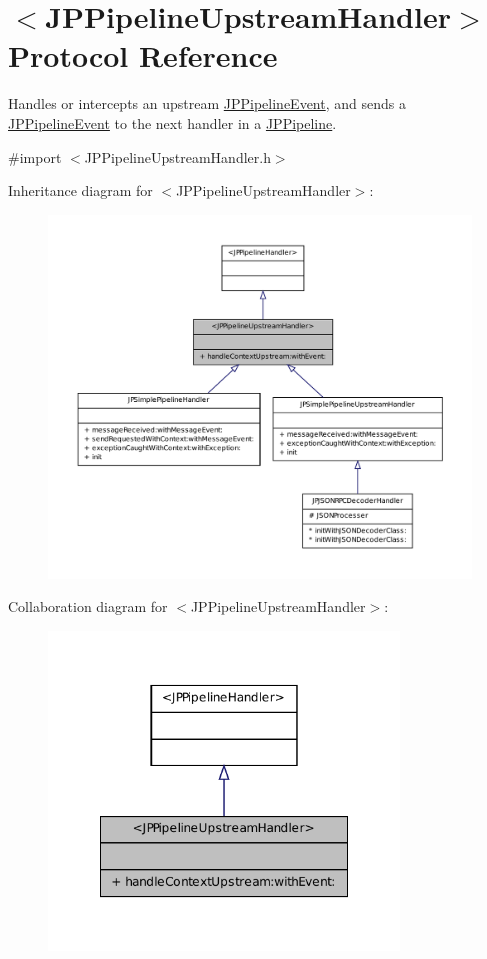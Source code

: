\hypertarget{a00035}{
\section{$<$JPPipelineUpstreamHandler$>$ Protocol Reference}
\label{a00035}
}


Handles or intercepts an upstream \hyperlink{a00023}{JPPipelineEvent}, and sends a \hyperlink{a00023}{JPPipelineEvent} to the next handler in a \hyperlink{a00019}{JPPipeline}.  




{\ttfamily \#import $<$JPPipelineUpstreamHandler.h$>$}



Inheritance diagram for $<$JPPipelineUpstreamHandler$>$:\nopagebreak
\begin{figure}[H]
\begin{center}
\leavevmode
\includegraphics[width=400pt]{a00152}
\end{center}
\end{figure}


Collaboration diagram for $<$JPPipelineUpstreamHandler$>$:\nopagebreak
\begin{figure}[H]
\begin{center}
\leavevmode
\includegraphics[width=264pt]{a00153}
\end{center}
\end{figure}
